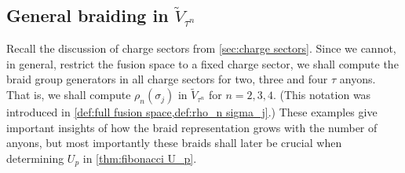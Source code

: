 \documentclass[a4paper,10pt,oneside]{book}
\theoremstyle{plain}
\theoremstyle{definition}
\theoremstyle{remark}
\begin{document}
\subsection{General braiding in \texorpdfstring{$\widetilde{V}_{τ^n}$}{V\~\_(τⁿ)}}

Recall the discussion of charge sectors from \cref{sec:charge sectors}. Since we cannot, in general, restrict the fusion space to a fixed charge sector, we shall compute the braid group generators in all charge sectors for two, three and four $τ$ anyons. That is, we shall compute $ρ_n(σ_j)$ in $\widetilde{V}_{τ^n}$ for $n=2,3,4$. (This notation was introduced in \cref{def:full fusion space,def:rho_n sigma_j}.) These examples give important insights of how the braid representation grows with the number of anyons, but most importantly these braids shall later be crucial when determining $U_p$ in \cref{thm:fibonacci U_p}.
\end{document}

